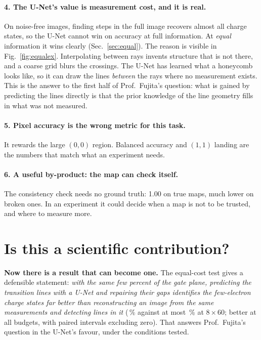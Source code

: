 \documentclass[10pt,a4paper]{article}
\begin{document}
\paragraph{4. The U-Net's value is measurement cost, and it is real.}  On
noise-free images, finding steps in the full image recovers almost all
charge states, so the U-Net cannot win on accuracy at full information.
At \emph{equal} information it wins clearly (Sec.~\ref{sec:equal}).  The
reason is visible in Fig.~\ref{fig:equalex}.  Interpolating between rays
invents structure that is not there, and a coarse grid blurs the crossings.
The U-Net has learned what a honeycomb looks like, so it can draw the lines
\emph{between} the rays where no measurement exists.  This is the
answer to the first half of Prof.\ Fujita's question: what is gained by
predicting the lines directly is that the prior knowledge of the line
geometry fills in what was not measured.

\paragraph{5. Pixel accuracy is the wrong metric for this task.}  It
rewards the large $(0,0)$ region.  Balanced accuracy and $(1,1)$ landing
are the numbers that match what an experiment needs.

\paragraph{6. A useful by-product: the map can check itself.}  The
consistency check needs no ground truth: 1.00 on true maps, much lower on
broken ones.  In an experiment it could decide when a map is not to be
trusted, and where to measure more.

\section{Is this a scientific contribution?}
\label{sec:contribution}

\textbf{Now there is a result that can become one.}  The equal-cost test
gives a defensible statement: \emph{with the same few percent of the gate
plane, predicting the transition lines with a U-Net and repairing their
gaps identifies the few-electron charge states far better than
reconstructing an image from the same measurements and detecting lines in
it} (\vFBal\,\% against at most \vEqCompBal\,\% at $8\times60$; better at all
\vEqNBud{} budgets, with paired intervals excluding zero).  That answers
Prof.\ Fujita's question in the U-Net's favour, under the conditions
tested.
\end{document}
